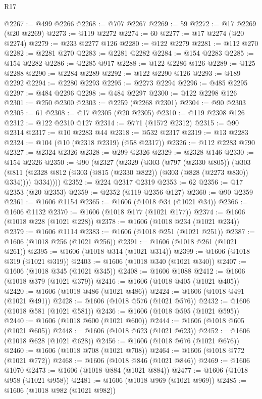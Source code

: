 \begin{lexlean}{R17}
\begin{coremodule}
@2267 := @499 @2266
@2268 := @707 @2267
@2269 := 59
@2272 := @17 @2269 (@20 @2269)
@2273 := @119 @2272
@2274 := 60
@2277 := @17 @2274 (@20 @2274)
@2279 := @233 @2277 @126
@2280 := @122 @2279
@2281 := @112 @270
@2282 := @2281 @270
@2283 := @2281 @2282
@2284 := @154 @2283
@2285 := @154 @2282
@2286 := @2285 @917
@2288 := @122 @2286 @126
@2289 := @125 @2288
@2290 := @2284 @2289
@2292 := @122 @2290 @126
@2293 := @189 @2292
@2294 := @2280 @2293
@2295 := @2273 @2294
@2296 := @485 @2295
@2297 := @484 @2296
@2298 := @484 @2297
@2300 := @122 @2298 @126
@2301 := @250 @2300
@2303 := @2259 (@2268 @2301)
@2304 := @90 @2303
@2305 := 61
@2308 := @17 @2305 (@20 @2305)
@2310 := @119 @2308 @126
@2312 := @122 @2310 @127
@2314 := @771 (@1572 @2312)
@2315 := @90 @2314
@2317 := @10 @2283 @44
@2318 := @532 @2317
@2319 := @13 @2283
@2324 := @104 (@10 (@2318 @2319) (@58 @2317))
@2326 := @112 @2283 @790
@2327 := @2324 @2326
@2328 := @299 @2326
@2329 := @2328 @146
@2330 := @154 @2326
@2350 := @90
    (@2327
      (@2329
        (@303
          (@797 (@2330 @805))
          (@303
            (@811 (@2328 @812 (@303 (@815 (@2330 @822)) (@303 (@828 (@2273 @830)) @334))))
            @334))))
@2352 := @224 @2317 @2319
@2353 := 62
@2356 := @17 @2353 (@20 @2353)
@2359 := @2352 (@119 @2356 @127)
@2360 := @90 @2359
@2361 := @1606 @1154
@2365 := @1606 (@1018 @34 (@1021 @34))
@2366 := @1606 @1132
@2370 := @1606 (@1018 @177 (@1021 @177))
@2374 := @1606 (@1018 @228 (@1021 @228))
@2378 := @1606 (@1018 @234 (@1021 @234))
@2379 := @1606 @1114
@2383 := @1606 (@1018 @251 (@1021 @251))
@2387 := @1606 (@1018 @256 (@1021 @256))
@2391 := @1606 (@1018 @261 (@1021 @261))
@2395 := @1606 (@1018 @314 (@1021 @314))
@2399 := @1606 (@1018 @319 (@1021 @319))
@2403 := @1606 (@1018 @340 (@1021 @340))
@2407 := @1606 (@1018 @345 (@1021 @345))
@2408 := @1606 @1088
@2412 := @1606 (@1018 @379 (@1021 @379))
@2416 := @1606 (@1018 @405 (@1021 @405))
@2420 := @1606 (@1018 @486 (@1021 @486))
@2424 := @1606 (@1018 @491 (@1021 @491))
@2428 := @1606 (@1018 @576 (@1021 @576))
@2432 := @1606 (@1018 @581 (@1021 @581))
@2436 := @1606 (@1018 @595 (@1021 @595))
@2440 := @1606 (@1018 @600 (@1021 @600))
@2444 := @1606 (@1018 @605 (@1021 @605))
@2448 := @1606 (@1018 @623 (@1021 @623))
@2452 := @1606 (@1018 @628 (@1021 @628))
@2456 := @1606 (@1018 @676 (@1021 @676))
@2460 := @1606 (@1018 @708 (@1021 @708))
@2464 := @1606 (@1018 @772 (@1021 @772))
@2468 := @1606 (@1018 @846 (@1021 @846))
@2469 := @1606 @1070
@2473 := @1606 (@1018 @884 (@1021 @884))
@2477 := @1606 (@1018 @958 (@1021 @958))
@2481 := @1606 (@1018 @969 (@1021 @969))
@2485 := @1606 (@1018 @982 (@1021 @982))

\end{coremodule}
\end{lexlean}
